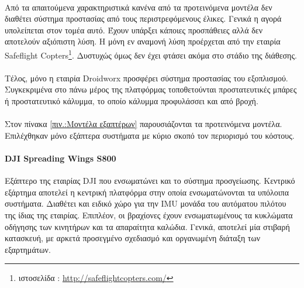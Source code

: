 \documentclass[a4paper, 12pt, twoside]{report}
\begin{document}
{{{{{{			\paragraph{}{Από τα απαιτούμενα χαρακτηριστικά κανένα από τα προτεινόμενα μοντέλα δεν διαθέτει σύστημα προστασίας από τους περιστρεφόμενους έλικες. Γενικά η αγορά υπολείπεται στον τομέα αυτό. Έχουν υπάρξει κάποιες προσπάθειες αλλά δεν αποτελούν αξιόπιστη λύση. Η μόνη εν αναμονή λύση προέρχεται από την εταιρία Safeflight Copters\footnote{ιστοσελίδα : \url{http://safeflightcopters.com/}}. Δυστυχώς όμως δεν έχει φτάσει ακόμα στο στάδιο της διάθεσης.
			}
			\paragraph{}{Τέλος, μόνο η εταιρία Droidworx προσφέρει σύστημα προστασίας του εξοπλισμού. Συγκεκριμένα στο πάνω μέρος της πλατφόρμας τοποθετούνται προστατευτικές μπάρες ή προστατευτικό κάλυμμα, το οποίο κάλυμμα προφυλάσσει και από βροχή.
			}
			
			\paragraph{}{Στον πίνακα \ref{πιν.:Μοντέλα εξαπτέρων} παρουσιάζονται τα προτεινόμενα μοντέλα. Επιλέχθηκαν μόνο εξάπτερα συστήματα με κύριο σκοπό τον περιορισμό του κόστους.
			}
			\paragraph{DJI Spreading Wings S800}{Εξάπτερο της εταιρίας DJI που ενσωματώνει και το σύστημα προσγείωσης. Κεντρικό εξάρτημα αποτελεί η κεντρική πλατφόρμα στην οποία ενσωματώνονται τα υπόλοιπα συστήματα. Διαθέτει και ειδικό χώρο για την IMU μονάδα του αυτόματου πιλότου της ίδιας της εταιρίας. Επιπλέον, οι βραχίονες έχουν ενσωματωμένους τα κυκλώματα οδήγησης των κινητήρων και τα απαραίτητα καλώδια. Γενικά, αποτελεί μία στιβαρή κατασκευή, με αρκετά προσεγμένο σχεδιασμό και οργανωμένη διάταξη των εξαρτημάτων.
			}
}}}}}}
\end{document}
